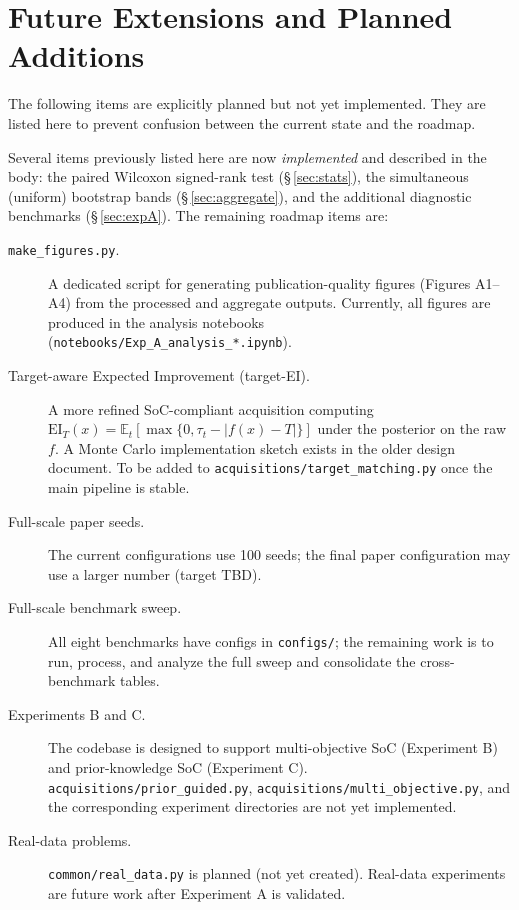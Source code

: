 \documentclass[11pt]{article}
\begin{document}
\section{Future Extensions and Planned Additions}
\label{sec:future}
 
The following items are explicitly planned but not yet implemented.
They are listed here to prevent confusion between the current state and the roadmap.
 
Several items previously listed here are now \emph{implemented} and described in
the body: the paired Wilcoxon signed-rank test
(\S\,\ref{sec:stats}), the simultaneous (uniform) bootstrap bands
(\S\,\ref{sec:aggregate}), and the additional diagnostic benchmarks
(\S\,\ref{sec:expA}). The remaining roadmap items are:

\begin{description}

  \item[\texttt{make\_figures.py}.]
  A dedicated script for generating publication-quality figures
  (Figures A1--A4) from the processed and aggregate outputs.
  Currently, all figures are produced in the analysis notebooks
  (\texttt{notebooks/Exp\_A\_analysis\_*.ipynb}).

  \item[Target-aware Expected Improvement (target-EI).]
  A more refined SoC-compliant acquisition computing
  $\mathrm{EI}_T(x) = \mathbb{E}_t[\max\{0, \tau_t - |f(x)-T|\}]$
  under the posterior on the raw $f$.
  A Monte Carlo implementation sketch exists in the older design document.
  To be added to \texttt{acquisitions/target\_matching.py} once the main pipeline is
  stable.

  \item[Full-scale paper seeds.]
  The current configurations use 100 seeds; the final paper configuration may use
  a larger number (target TBD).

  \item[Full-scale benchmark sweep.]
  All eight benchmarks have configs in \texttt{configs/}; the remaining work is to
  run, process, and analyze the full sweep and consolidate the cross-benchmark
  tables.

  \item[Experiments B and C.]
  The codebase is designed to support multi-objective SoC (Experiment B) and
  prior-knowledge SoC (Experiment C).
  \texttt{acquisitions/prior\_guided.py}, \texttt{acquisitions/multi\_objective.py},
  and the corresponding experiment directories are not yet implemented.

  \item[Real-data problems.]
  \texttt{common/real\_data.py} is planned (not yet created).
  Real-data experiments are future work after Experiment A is validated.

\end{description}
 
\end{document}

